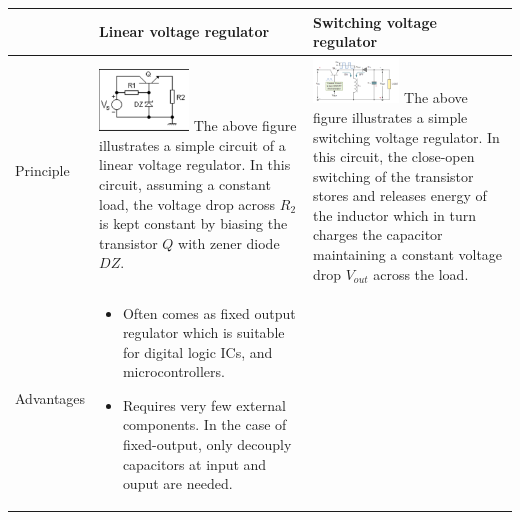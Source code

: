 \documentclass[../main.tex]{subfiles}
\begin{document}
    \begin{table}[!h]
        \centering
        \begin{tabular}{|m{0.1\linewidth}|m{0.45\linewidth}|m{0.45\linewidth}|}
        
        \hline
        & Linear voltage regulator & Switching voltage regulator \\
        \hline
        Principle & 

        \includegraphics[width=0.45\textwidth]{media/series_regulator.png}
        The above figure illustrates a simple circuit of a linear voltage regulator. In this circuit, assuming a constant load, the voltage drop across $R_2$ is kept constant by biasing the transistor $Q$ with zener diode $DZ$. &

        \includegraphics[width=0.45\textwidth]{media/inverting_switch_regulator.png}
        The above figure illustrates a simple switching voltage regulator. In this circuit, the close-open switching of the transistor stores and releases energy of the inductor which in turn charges the capacitor maintaining a constant voltage drop $V_{out}$ across the load. \\

        \hline
        Advantages & 

        \begin{itemize}
            \item Often comes as fixed output regulator which is suitable for digital logic ICs, and microcontrollers.
            \item Requires very few external components. In the case of fixed-output, only decouply capacitors at input and ouput are needed.
        \end{itemize} &
        

\end{tabular}
\end{table}
\end{document}
